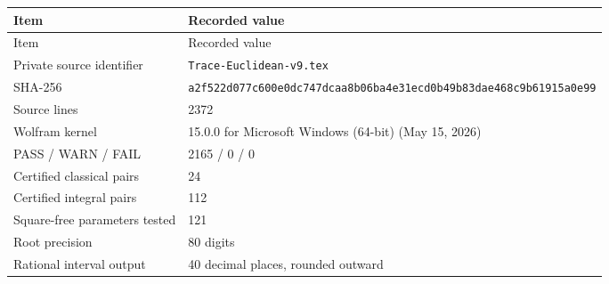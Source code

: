 {\small
\begin{longtable}{@{}p{46mm}p{108mm}@{}}
\toprule
Item & Recorded value \\
\midrule\endfirsthead
\toprule
Item & Recorded value \\
\midrule\endhead
\bottomrule\endfoot
Private source identifier & \nolinkurl{Trace-Euclidean-v9.tex} \\
SHA-256 & \nolinkurl{a2f522d077c600e0dc747dcaa8b06ba4e31ecd0b49b83dae468c9b61915a0e99} \\
Source lines & 2372 \\
Wolfram kernel & 15.0.0 for Microsoft Windows (64-bit) (May 15, 2026) \\
PASS / WARN / FAIL & 2165 / 0 / 0 \\
Certified classical pairs & 24 \\
Certified integral pairs & 112 \\
Square-free parameters tested & 121 \\
Root precision & 80 digits \\
Rational interval output & 40 decimal places, rounded outward \\
\end{longtable}
}
